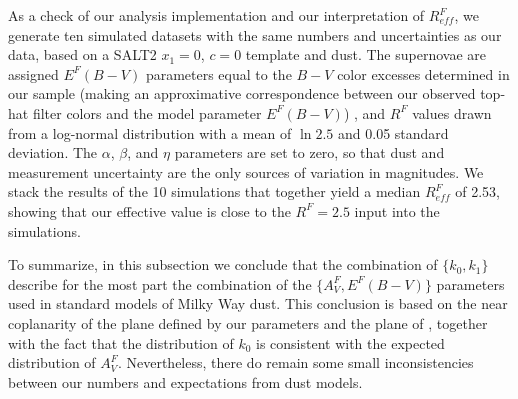 \documentclass{aastex61}   	%
\begin{document}
As a check of our analysis implementation and our
interpretation of $R^F_{eff}$, we generate ten simulated datasets with the same numbers and uncertainties as our data, based on a
SALT2 $x_1=0$, $c=0$ template and   dust.  The supernovae
are assigned $E^F(B-V)$ parameters equal to the $B-V$ color excesses determined in our sample
(making an approximative correspondence between our observed top-hat filter colors and the 
model parameter $E^F(B-V)$) , and $R^F$ values drawn from a log-normal
distribution with a mean of $\ln{2.5}$ and 0.05 standard deviation.  The $\alpha$, $\beta$, and $\eta$ parameters are set to zero, so that dust and
measurement uncertainty are the only sources of variation in magnitudes.  We stack the results of the 10 simulations that together yield a median
$R^F_{eff}$ of 2.53, showing that our effective value is close to the  $R^F=2.5$ input into the simulations.

To summarize, in this subsection
we conclude that the combination of
$\{k_0, k_1\}$ describe for the most part the combination of the $\{A^F_V, E^F(B-V)\}$ parameters used
in standard models of Milky Way dust.  
This conclusion is based on the
near coplanarity of the plane defined by our parameters and the plane of  , together with the fact that 
the distribution of $k_0$ is consistent with the expected distribution of $A^F_V$.
Nevertheless, there do remain some small inconsistencies between our numbers and expectations from dust models.
\end{document}
